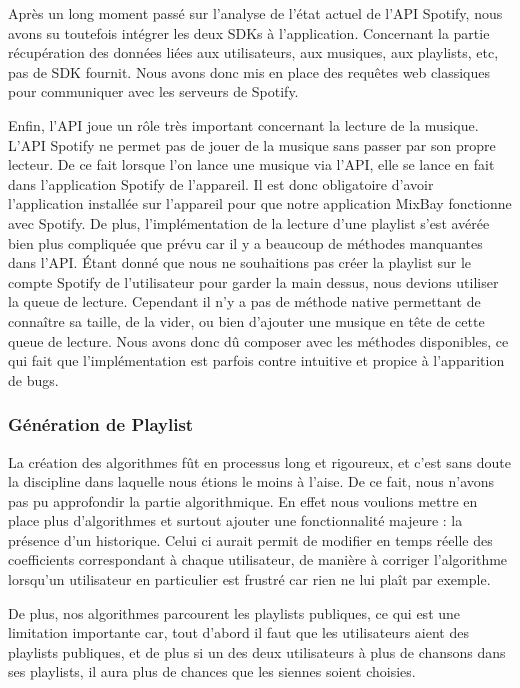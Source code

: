 \documentclass{article}
\begin{document}
		Après un long moment passé sur  l'analyse de l'état actuel de l'API Spotify, nous avons su toutefois intégrer les deux SDKs à l'application. Concernant la partie récupération des données liées aux utilisateurs, aux musiques, aux playlists, etc, pas de SDK fournit. Nous avons donc mis en place des requêtes web classiques pour communiquer avec les serveurs de Spotify.
		
		Enfin, l'API joue un rôle très important concernant la lecture de la musique. L'API Spotify ne permet pas de jouer de la musique sans passer par son propre lecteur. De ce fait lorsque l'on lance une musique via l'API, elle se lance en fait dans l'application Spotify de l'appareil. Il est donc obligatoire d'avoir l'application installée sur l'appareil pour que notre application MixBay fonctionne avec Spotify. De plus, l'implémentation de la lecture d'une playlist s'est avérée bien plus compliquée que prévu car il y a beaucoup de méthodes manquantes dans l'API. Étant donné que nous ne souhaitions pas créer la playlist sur le compte Spotify de l'utilisateur pour garder la main dessus, nous devions utiliser la queue de lecture. Cependant il n'y a pas de méthode native permettant de connaître sa taille, de la vider, ou bien d'ajouter une musique en tête de cette queue de lecture. Nous avons donc dû composer avec les méthodes disponibles, ce qui fait que l'implémentation est parfois contre intuitive et propice à l'apparition de bugs. 
		
		
		\subsubsection{Génération de Playlist}
		La création des algorithmes fût en processus long et rigoureux, et c'est sans doute la discipline dans laquelle nous étions le moins à l'aise. De ce fait, nous n'avons pas pu approfondir la partie algorithmique. En effet nous voulions mettre en place plus d'algorithmes et surtout ajouter une fonctionnalité majeure : la présence d'un historique. Celui ci aurait permit de modifier en temps réelle des coefficients correspondant à chaque utilisateur, de manière à corriger l'algorithme lorsqu'un utilisateur en particulier est frustré car rien ne lui plaît par exemple. 
		
		De plus, nos algorithmes parcourent les playlists publiques, ce qui est une limitation importante car, tout d'abord il faut que les utilisateurs aient des playlists publiques, et de plus si un des deux utilisateurs à plus de chansons dans ses playlists, il aura plus de chances que les siennes soient choisies.
		
\end{document}
